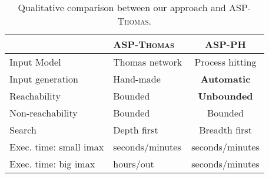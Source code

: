 \begin{table}[ht]
\begin{center}
\noindent%
\begin{tabular}{|l|l|c|}
\hline
  & \textsc{ASP-Thomas} & \textsc{ASP-PH} \\
\hline
\hline
 Input Model & Thomas network & Process hitting \\
\hline
 Input generation & Hand-made & {\bf Automatic} \\ %
\hline
 Reachability & Bounded & {\bf Unbounded} \\
\hline
 Non-reachability & Bounded & Bounded \\
\hline
 Search & Depth first & Breadth first \\
  \hline
 Exec. time: small imax & seconds/minutes & seconds/minutes \\
 \hline
 Exec. time: big imax & hours/out &seconds/minutes  \\
\hline
\end{tabular}
\vspace*{4pt}
\caption{\label{tab:qualitative_differences}
Qualitative comparison between our approach and \textsc{ASP-Thomas}.
}
\end{center}
\end{table}


